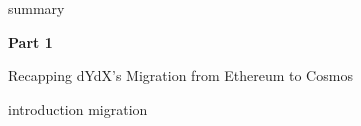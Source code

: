 \documentclass[
        a4paper, %
	8pt, %
]{CSSullivanBusinessReport}
\begin{document}
\newpage

\pagecolor{white}
\color{black}

\thispagestyle{empty} %

\begin{twothirdswidth} %
	\tableofcontents %
\end{twothirdswidth}

\newpage

\justify

{summary}

\newpage
\pagecolor{bg}
\color{white}
\begin{fullwidth} %
	\vspace*{-0.075\textheight} %
	\vspace{0.15\textheight} %
	\parbox{0.9\fulltextwidth}{\fontsize{50pt}{52pt}\selectfont\raggedright\textbf{Part 1}\par} %
 
        \vspace{0.03\textheight} %
        
        {\Huge{Recapping dYdX's Migration from Ethereum to Cosmos}\par} %
\end{fullwidth}
\newpage
\pagecolor{white}
\color{black}


{introduction}
\clearpage
{migration}
\end{document}
